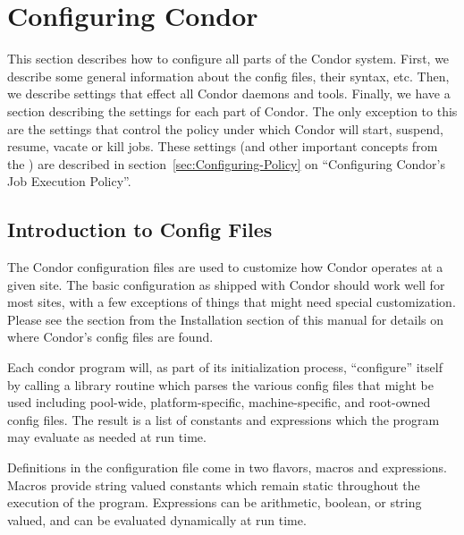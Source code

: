 \section{Configuring Condor}
\label{sec:Configuring-Condor}

This section describes how to configure all parts of the Condor
system.  First, we describe some general information about the config
files, their syntax, etc.  Then, we describe settings that effect all
Condor daemons and tools.  Finally, we have a section describing the
settings for each part of Condor.  The only exception to this are the
settings that control the policy under which Condor will start,
suspend, resume, vacate or kill jobs.  These settings (and other
important concepts from the ) are described in 
section~\ref{sec:Configuring-Policy} on ``Configuring Condor's Job
Execution Policy''. 

\subsection{Introduction to Config Files}
\label{sec:Intro-to-Config-Files}

The Condor configuration files are used to customize how Condor
operates at a given site.  The basic configuration as shipped with
Condor should work well for most sites, with a few exceptions of
things that might need special customization.  Please see the section
from the Installation section of this manual for details on where
Condor's config files are found.

Each condor program will, as part of its initialization process,
``configure'' itself by calling a library routine which parses the
various config files that might be used including pool-wide,
platform-specific, machine-specific, and root-owned config files.  The
result is a list of constants and expressions which the program may
evaluate as needed at run time.

Definitions in the configuration file come in two flavors, macros and
expressions.  Macros provide string valued constants which remain
static throughout the execution of the program.  Expressions can be
arithmetic, boolean, or string valued, and can be evaluated
dynamically at run time.

